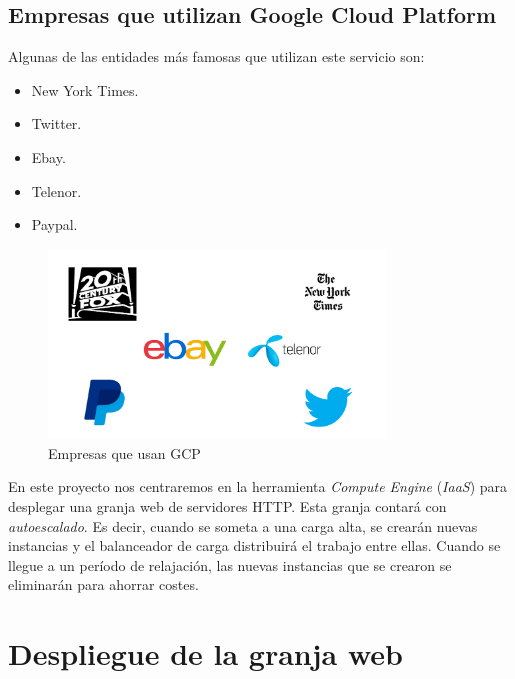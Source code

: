 \documentclass[12pt,spanish]{article}
\begin{document}
\subsection{Empresas que utilizan Google Cloud Platform}

Algunas de las entidades más famosas que utilizan este servicio son:
\begin{itemize}
 \item New York Times.
 \item Twitter.
 \item Ebay.
 \item Telenor.
 \item Paypal.
\end{itemize}

\begin{figure}[H]
	\centering
	\includegraphics[width=0.8\textwidth]{project/logos.png}
	\caption{Empresas que usan GCP}
\end{figure}

En este proyecto nos centraremos en la herramienta \emph{Compute Engine} (\emph{IaaS}) para desplegar una granja web de servidores HTTP. Esta granja contará con \emph{autoescalado}. Es decir, cuando se someta a una carga alta, se crearán nuevas instancias y el balanceador de carga distribuirá el trabajo entre ellas. Cuando se llegue a un período de relajación, las nuevas instancias que se crearon se eliminarán para ahorrar costes.

\newpage
\section{Despliegue de la granja web}
\end{document}
